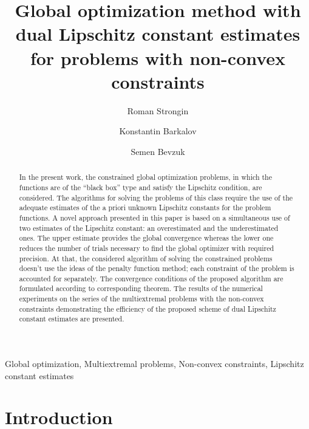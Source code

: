 \documentclass[review]{elsarticle}
\begin{document}
\begin{frontmatter}

\title{Global optimization method with dual Lipschitz constant estimates for problems with non-convex constraints}

\author{Roman Strongin}
\author{Konstantin Barkalov}
\author{Semen Bevzuk}
\address{Lobachevsky State University of Nizhni Novgorod, Nizhni Novgorod, Russia}

\begin{abstract}
In the present work, the constrained global optimization problems, in which the functions are of the “black box” type and satisfy the Lipschitz condition, are considered. The algorithms for solving the problems of this class require the use of the adequate estimates of the a priori unknown Lipschitz constants for the problem functions. A novel approach presented in this paper is based on a simultaneous use of two estimates of the Lipschitz constant: an overestimated and the underestimated ones. The upper estimate provides the global convergence whereas the lower one reduces the number of trials necessary to find the global optimizer with required precision. At that, the considered algorithm of solving the constrained problems doesn’t use the ideas of the penalty function method; each constraint of the problem is accounted for separately. The convergence conditions of the proposed algorithm are formulated according to corresponding theorem. The results of the numerical experiments on the series of the multiextremal problems with the non-convex constraints demonstrating the efficiency of the proposed scheme of dual Lipschitz constant estimates are presented.
\end{abstract}

\begin{keyword}
Global optimization, Multiextremal problems, Non-convex constraints, Lipschitz constant estimates 
\end{keyword}

\end{frontmatter}

\linenumbers


\section{Introduction}
\end{document}

